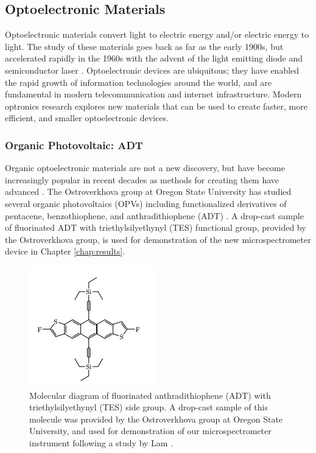\subsection{Optoelectronic Materials}\label{chap:intro-optomats}

Optoelectronic materials convert light to electric energy and/or electric energy to light. The study of these materials goes back as far as the early 1900s, but accelerated rapidly in the 1960s with the advent of the light emitting diode and semiconductor laser \cite{sweeney_optoelectronic_2017}. Optoelectronic devices are ubiquitous; they have enabled the rapid growth of information technologies around the world, and are fundamental in modern telecommunication and internet infrastructure. Modern optronics research explores new materials that can be used to create faster, more efficient, and smaller optoelectronic devices.

\subsubsection{Organic Photovoltaic: ADT}\label{chap:intro-optomats-adt}

Organic optoelectronic materials are not a new discovery, but have become increasingly popular in recent decades as methods for creating them have advanced \cite{ostroverkhova_organic_2016}. The Ostroverkhova group at Oregon State University has studied several organic photovoltaics (OPVs) including functionalized derivatives of pentacene, benzothiophene, and anthradithiophene (ADT) \cite{e._b._shepherd_effect_2011, platt_optical_2009}. A drop-cast sample of fluorinated ADT with triethylsilyethynyl (TES) functional group, provided by the Ostroverkhova group, is used for demonstration of the new microspectrometer device in Chapter \ref{chap:results}.

\begin{figure}[H]
    \centering
    \includegraphics{img/adt-tes-f.png}
    \caption[Molecular diagram of ADT TES-F.]{Molecular diagram of fluorinated anthradithiophene (ADT) with triethylsilyethynyl (TES) side group. A drop-cast sample of this molecule was provided by the Ostroverkhova group at Oregon State University, and used for demonstration of our microspectrometer instrument following a study by Lam \cite{lam_polarization_2018}.}
    \label{fig:adt-diagram}
\end{figure}

